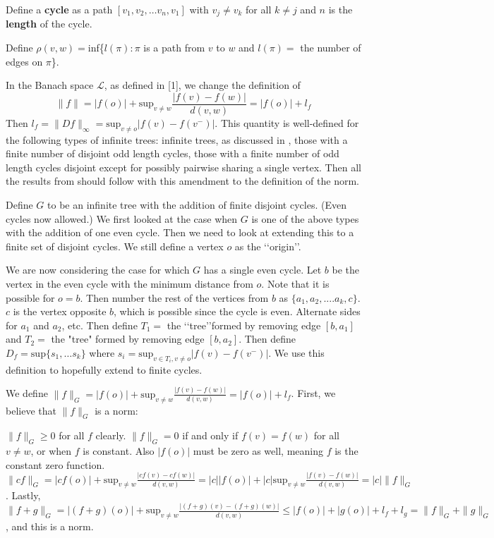 \documentclass[11 pt]{report}
\theoremstyle{definition}
\theoremstyle{definition}
\begin{document}
\indent Define a \textbf{cycle} as a path $[v_1, v_2, \dots v_n, v_1]$ with $v_j \neq v_k$ for all $k \neq j$ and $n$ is the \textbf{length} of the cycle.

\indent Define $\rho (v,w) = $inf\{$l(\pi): \pi$ is a path from $v$ to $w$ and $l(\pi)=$ the number of edges on $\pi$\}. 

\indent In the Banach space $\mathcal{L}$, as defined in [1], we change the definition of $$\| f \| = |f(o)| + \text{sup}_{v \neq w} \frac{|f(v)-f(w)|}{d(v,w)} = |f(o)| + \textit{l}_f$$ Then $\textit{l}_f = \|Df\|_\infty = \text{sup}_{v \neq o} |f(v)-f(v^-)|$. This quantity is well-defined for the following types of infinite trees: infinite trees, as discussed in \cite{Tree}, those with a finite number of disjoint odd length cycles, those with a finite number of odd length cycles disjoint except for possibly pairwise sharing a single vertex. Then all the results from \cite{Tree} should follow with this amendment to the definition of the norm. 

\indent Define $G$ to be an infinite tree with the addition of finite disjoint cycles. (Even cycles now allowed.) We first looked at the case when $G$ is one of the above types with the addition of one even cycle. Then we need to look at extending this to a finite set of disjoint cycles. We still define a vertex $o$ as the \lq\lq origin\rq\rq. 

\indent We are now considering the case for which $G$ has a single even cycle. Let $b$ be the vertex in the even cycle with the minimum distance from $o$. Note that it is possible for $o=b$. Then number the rest of the vertices from $b$ as $\{a_1, a_2, ....a_k, c\}$. $c$ is the vertex opposite $b$, which is possible since the cycle is even. Alternate sides for $a_1$ and $a_2$, etc. Then define $T_1 = $ the \lq\lq tree\rq\rq  formed by removing edge $[b, a_1]$ and $T_2 =$ the "tree" formed by removing edge $[b,a_2]$. Then define $D_f = \text{sup}\{s_1, \dots s_k\}$ where $s_i = \text{sup}_{v \in T_i, v \neq o} |f(v) - f(v^-)|$. We use this definition to hopefully extend to finite cycles. 

\indent We define $\| f\|_G = |f(o)| + \text{sup}_{v \neq w} \frac{|f(v)-f(w)|}{d(v,w)} = |f(o)| + l_f$.  First, we believe that $\|f\|_G$ is a norm:

\indent \indent $\|f\|_G \ge 0$ for all $f$ clearly. $\|f\|_G=0$ if and only if $f(v) = f(w)$ for all $v\neq w$, or when $f$ is constant. Also $|f(o)|$ must be zero as well, meaning $f$ is the constant zero function.  $\|cf\|_G = |cf(o)| + \text{sup}_{v \neq w} \frac{|cf(v)-cf(w)|}{d(v,w)} = |c||f(o)| + |c|\text{sup}_{v\neq w} \frac{|f(v)-f(w)|}{d(v,w)} = |c|\|f\|_G$.  Lastly, $\|f+g\|_G=|(f+g)(o)|+\text{sup}_{v\neq w} \frac{|(f+g)(v) - (f+g)(w)|}{d(v,w)} \le |f(o)| + |g(o)| + l_f + l_g = \|f\|_G + \|g\|_G$, and this is a norm.
\end{document}
